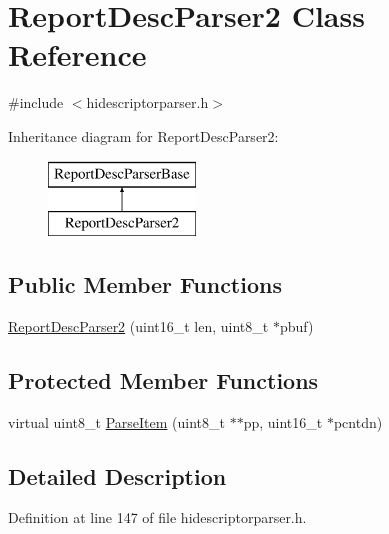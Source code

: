 \hypertarget{class_report_desc_parser2}{\section{\-Report\-Desc\-Parser2 \-Class \-Reference}
\label{class_report_desc_parser2}
}


{\ttfamily \#include $<$hidescriptorparser.\-h$>$}

\-Inheritance diagram for \-Report\-Desc\-Parser2\-:\begin{figure}[H]
\begin{center}
\leavevmode
\includegraphics[height=2.000000cm]{class_report_desc_parser2}
\end{center}
\end{figure}
\subsection*{\-Public \-Member \-Functions}
\begin{DoxyCompactItemize}
\item 
\hyperlink{class_report_desc_parser2_a6ee7a47ffbc5c2905506c10039fcfaff}{\-Report\-Desc\-Parser2} (uint16\-\_\-t len, uint8\-\_\-t $\ast$pbuf)
\end{DoxyCompactItemize}
\subsection*{\-Protected \-Member \-Functions}
\begin{DoxyCompactItemize}
\item 
virtual uint8\-\_\-t \hyperlink{class_report_desc_parser2_a84242b62a5d202b5d2d6fe26809bc0e2}{\-Parse\-Item} (uint8\-\_\-t $\ast$$\ast$pp, uint16\-\_\-t $\ast$pcntdn)
\end{DoxyCompactItemize}


\subsection{\-Detailed \-Description}


\-Definition at line 147 of file hidescriptorparser.\-h.




